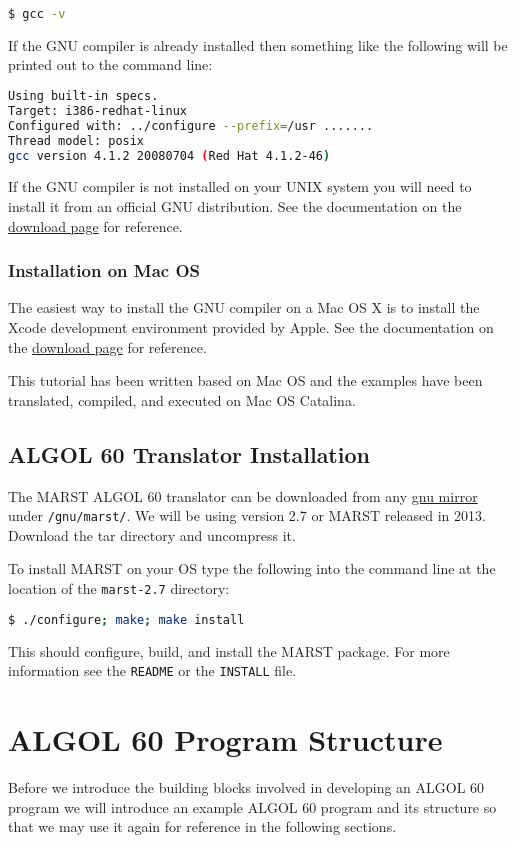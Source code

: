 \documentclass{article}
\begin{document}
\begin{lstlisting}[language=bash]
$ gcc -v
\end{lstlisting}

If the GNU compiler is already installed then something like the following will be printed out to the command line:

\begin{lstlisting}[language=bash]
Using built-in specs. 
Target: i386-redhat-linux 
Configured with: ../configure --prefix=/usr ....... 
Thread model: posix 
gcc version 4.1.2 20080704 (Red Hat 4.1.2-46)
\end{lstlisting}

If the GNU compiler is not installed on your UNIX system you will need to install it from an official GNU distribution. See the documentation on the \href{http://gcc.gnu.org/install/}{download page} for reference.

\subsubsection{Installation on Mac OS}
The easiest way to install the GNU compiler on a Mac OS X is to install the Xcode development environment provided by Apple. See the documentation on the \href{https://developer.apple.com/xcode/}{download page} for reference.

This tutorial has been written based on Mac OS and the examples have been translated, compiled, and executed on Mac OS Catalina.

\subsection{ALGOL 60 Translator Installation}
The MARST ALGOL 60 translator can be downloaded from any \href{https://www.gnu.org/prep/ftp.html}{gnu mirror} under \texttt{/gnu/marst/}. We will be using version 2.7 or MARST released in 2013. Download the tar directory and uncompress it.

To install MARST on your OS type the following into the command line at the location of the \texttt{marst-2.7} directory:

\begin{lstlisting}[language=bash]
$ ./configure; make; make install
\end{lstlisting}

This should configure, build, and install the MARST package. For more information see the \texttt{README} or the \texttt{INSTALL} file.
\newpage
\section{ALGOL 60 Program Structure}
Before we introduce the building blocks involved in developing an ALGOL 60 program we will introduce an example ALGOL 60 program and its structure so that we may use it again for reference in the following sections.
\end{document}
